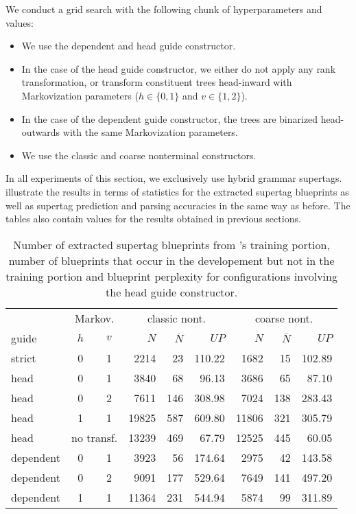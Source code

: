 \documentclass[../../document.tex]{subfiles}
\begin{document}
    We conduct a grid search with the following chunk of hyperparameters and values:
    \begin{itemize}
        \item We use the dependent and head guide constructor.
        \item In the case of the head guide constructor, we either do not apply any rank transformation, or transform constituent trees head-inward with Markovization parameters ($h \in \{0,1\}$ and $v \in \{1,2\}$).
        \item In the case of the dependent guide constructor, the trees are binarized head-outwards with the same Markovization parameters.
        \item We use the classic and coarse nonterminal constructors.
    \end{itemize}
    In all experiments of this section, we exclusively use hybrid grammar supertags.
     illustrate the results in terms of statistics for the extracted supertag blueprints as well as supertag prediction and parsing accuracies in the same way as before.
    The tables also contain values for the results obtained in previous sections.

    \begin{table}
        \caption{\label{tbl:gridsearch:head:1}
        Number of extracted supertag blueprints from \negra{}'s training portion, number of blueprints that occur in the developement but not in the training portion and blueprint perplexity for configurations involving the head guide constructor.
        }
        \centering
        \vspace{.2cm}
        \begin{tabular}{lcc|rrr|rrr}
            \toprule
            & \multicolumn{2}{c|}{Markov.} & \multicolumn{3}{c|}{classic nont.} &  \multicolumn{3}{c}{coarse nont.} \\
guide      & \(h\) & \(v\) & $N$ & $\overline{N}$ & $\mathit{UP}$ & $N$ & $\overline{N}$ & $\mathit{UP}$  \\ \hline \rowcolor{black!10}
strict     & 0 & 1 & 2214 & 23 & 110.22 & 1682 & 15 & 102.89 \\\hline
head & 0 & 1 & 3840 & 68 & 96.13 & 3686 & 65 & 87.10 \\
head & 0 & 2 & 7611 & 146 & 308.98 & 7024 & 138 & 283.43 \\
head & 1 & 1 & 19825 & 587 & 609.80 & 11806 & 321 & 305.79 \\
head & \multicolumn{2}{c|}{no transf.}  & 13239 & 469 & 67.79 & 12525 & 445 & 60.05 \\ \hline
dependent & 0 & 1 & 3923 & 56 & 174.64 & 2975 & 42 & 143.58 \\
dependent & 0 & 2 & 9091 & 177 & 529.64 & 7649 & 141 & 497.20 \\
dependent & 1 & 1 & 11364 & 231 & 544.94 & 5874 & 99 & 311.89 \\
\bottomrule
        \end{tabular}
    \end{table}
\end{document}
